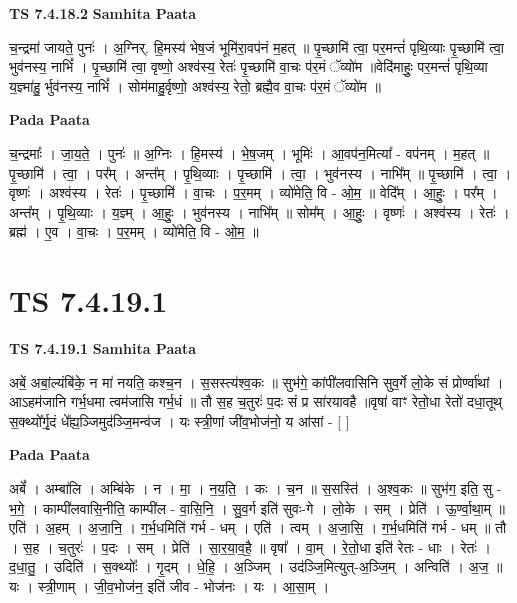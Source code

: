 \documentclass[17pt]{extarticle}
\begin{document}
\textbf{TS 7.4.18.2 } \newline
\textbf{Samhita Paata} \newline

च॒न्द्रमा॑ जायते॒ पुनः॑ । अ॒ग्निर्. हि॒मस्य॑ भेष॒जं भूमि॑रा॒वप॑नं म॒हत् ॥ पृ॒च्छामि॑ त्वा॒ पर॒मन्तं॑ पृथि॒व्याः पृ॒च्छामि॑ त्वा॒ भुव॑नस्य॒ नाभिं᳚ । पृ॒च्छामि॑ त्वा॒ वृष्णो॒ अश्व॑स्य॒ रेतः॑ पृ॒च्छामि॑ वा॒चः प॑र॒मं ॅव्यो॑म ॥वेदि॑माहुः॒ पर॒मन्तं॑ पृथि॒व्या य॒ज्ञ्मा॑हु॒ र्भुव॑नस्य॒ नाभिं᳚ । सोम॑माहु॒र्वृष्णो॒ अश्व॑स्य॒ रेतो॒ ब्रह्मै॒व वा॒चः प॑र॒मं ॅव्यो॑म ॥ \newline

\textbf{Pada Paata} \newline

च॒न्द्रमाः᳚ । जा॒य॒ते॒ । पुनः॑ ॥ अ॒ग्निः । हि॒मस्य॑ । भे॒ष॒जम् । भूमिः॑ । आ॒वप॑न॒मित्या᳚ - वप॑नम् । म॒हत् ॥ पृ॒च्छामि॑ । त्वा॒ । पर᳚म् । अन्त᳚म् । पृ॒थि॒व्याः । पृ॒च्छामि॑ । त्वा॒ । भुव॑नस्य । नाभि᳚म् ॥ पृ॒च्छामि॑ । त्वा॒ । वृष्णः॑ । अश्व॑स्य । रेतः॑ । पृ॒च्छामि॑ । वा॒चः । प॒र॒मम् । व्यो॑मेति॒ वि - ओ॒म॒ ॥ वेदि᳚म् । आ॒हुः॒ । पर᳚म् । अन्त᳚म् । पृ॒थि॒व्याः । य॒ज्ञ्म् । आ॒हुः॒ । भुव॑नस्य । नाभि᳚म् ॥ सोम᳚म् । आ॒हुः॒ । वृष्णः॑ । अश्व॑स्य । रेतः॑ । ब्रह्म॑ । ए॒व । वा॒चः । प॒र॒मम् । व्यो॑मेति॒ वि - ओ॒म॒ ॥  \newline




\section*{ TS 7.4.19.1 }

\textbf{TS 7.4.19.1 } \newline
\textbf{Samhita Paata} \newline

अबें॒ अबां॒ल्यंबि॑के॒ न मा॑ नयति॒ कश्च॒न । स॒सस्त्य॑श्व॒कः ॥ सुभ॑गे॒ कांपी॑लवासिनि सुव॒र्गे लो॒के सं प्रोर्ण्वा॑थां ।आऽहम॑जानि गर्भ॒धमा त्वम॑जासि गर्भ॒धं ॥ तौ स॒ह च॒तुरः॑ प॒दः सं प्र सा॑रयावहै ॥वृषा॑ वाꣳ रेतो॒धा रेतो॑ दधा॒तूथ् स॒क्थ्यो᳚र्गृ॒दं धे᳚ह्य॒ञ्जिमुद॑ञ्जि॒मन्व॑ज । यः स्त्री॒णां जी॑व॒भोज॑नो॒ य आ॑सां - [  ] \newline

\textbf{Pada Paata} \newline

अबें᳚ । अम्बा॑लि । अम्बि॑के । न । मा॒ । न॒य॒ति॒ । कः । च॒न ॥ स॒सस्ति॑ । अ॒श्व॒कः ॥ सुभ॑ग॒ इति॒ सु - भ॒गे॒ । काम्पी॑लवासि॒नीति॒ काम्पी॑ल - वा॒सि॒नि॒ । सु॒व॒र्ग इति॑ सुवः-गे । लो॒के । सम् । प्रेति॑ । ऊ॒र्ण्वा॒था॒म् ॥ एति॑ । अ॒हम् । अ॒जा॒नि॒ । ग॒र्भ॒धमिति॑ गर्भ - धम् । एति॑ । त्वम् । अ॒जा॒सि॒ । ग॒र्भ॒धमिति॑ गर्भ - धम् ॥ तौ । स॒ह । च॒तुरः॑ । प॒दः । सम् । प्रेति॑ । सा॒र॒या॒व॒है॒ ॥ वृषा᳚ । वा॒म् । रे॒तो॒धा इति॑ रेतः - धाः । रेतः॑ । द॒धा॒तु॒ । उदिति॑ । स॒क्थ्योः᳚ । गृ॒दम् । धे॒हि॒ । अ॒ञ्जिम् । उद॑ञ्जि॒मित्युत्-अ॒ञ्जि॒म् । अन्विति॑ । अ॒ज॒ ॥ यः । स्त्री॒णाम् । जी॒व॒भोज॑न॒ इति॑ जीव - भोज॑नः । यः । आ॒सा॒म् ।  \newline
\end{document}
